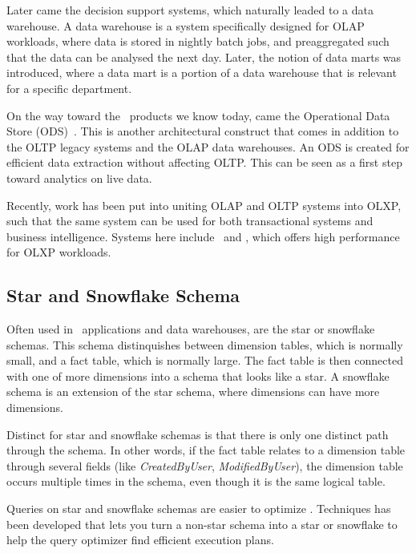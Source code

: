 Later came the decision support systems, which naturally leaded to a data warehouse. A data warehouse is a system specifically designed for OLAP workloads, where data is stored in nightly batch jobs, and preaggregated such that the data can be analysed the next day. Later, the notion of data marts was introduced, where a data mart is a portion of a data warehouse that is relevant for a specific department.

On the way toward the \bd~products we know today, came the Operational Data Store (ODS)~\cite{Pavlic2002-nm}. This is another architectural construct that comes in addition to the OLTP legacy systems and the OLAP data warehouses. An ODS is created for efficient data extraction without affecting OLTP. This can be seen as a first step toward analytics on live data.

Recently, work has been put into uniting OLAP and OLTP systems into OLXP, such that the same system can be used for both transactional systems and business intelligence. Systems here include \hyper~and \hyrise, which offers high performance for OLXP workloads. 

\subsection{Star and Snowflake Schema}
\label{sub:Star and Snowflake Schema}
Often used in \bi~applications and data warehouses, are the star or snowflake schemas. This schema distinquishes between dimension tables, which is normally small, and a fact table, which is normally large. The fact table is then connected with one of more dimensions into a schema that looks like a star. A snowflake schema is an extension of the star schema, where dimensions can have more dimensions. 

Distinct for star and snowflake schemas is that there is only one distinct path through the schema. In other words, if the fact table relates to a dimension table through several fields (like \textit{CreatedByUser}, \textit{ModifiedByUser}), the dimension table occurs multiple times in the schema, even though it is the same logical table. 

Queries on star and snowflake schemas are easier to optimize \cite{Lamb2012-kg} . Techniques has been developed that lets you turn a non-star schema into a star or snowflake to help the query optimizer find efficient execution plans.

